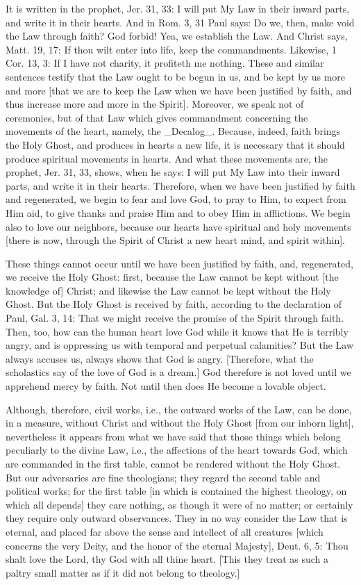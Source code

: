 It is written in the prophet, Jer. 31, 33: I will put My Law in their
inward parts, and write it in their hearts.  And in Rom. 3, 31 Paul
says: Do we, then, make void the Law through faith?  God forbid!  Yea,
we establish the Law.  And Christ says, Matt. 19, 17: If thou wilt
enter into life, keep the commandments.  Likewise, 1 Cor. 13, 3: If I
have not charity, it profiteth me nothing.  These and similar
sentences testify that the Law ought to be begun in us, and be kept
by us more and more [that we are to keep the Law when we have been
justified by faith, and thus increase more and more in the Spirit].
Moreover, we speak not of ceremonies, but of that Law which gives
commandment concerning the movements of the heart, namely, the
_Decalog_.  Because, indeed, faith brings the Holy Ghost, and
produces in hearts a new life, it is necessary that it should produce
spiritual movements in hearts.  And what these movements are, the
prophet, Jer. 31, 33, shows, when he says: I will put My Law into
their inward parts, and write it in their hearts.  Therefore, when we
have been justified by faith and regenerated, we begin to fear and
love God, to pray to Him, to expect from Him aid, to give thanks and
praise Him and to obey Him in afflictions.  We begin also to love our
neighbors, because our hearts have spiritual and holy movements
[there is now, through the Spirit of Christ a new heart mind, and
spirit within].

These things cannot occur until we have been justified by faith, and,
regenerated, we receive the Holy Ghost: first, because the Law cannot
be kept without [the knowledge of] Christ; and likewise the Law
cannot be kept without the Holy Ghost.  But the Holy Ghost is
received by faith, according to the declaration of Paul, Gal. 3, 14:
That we might receive the promise of the Spirit through faith.  Then,
too, how can the human heart love God while it knows that He is
terribly angry, and is oppressing us with temporal and perpetual
calamities?  But the Law always accuses us, always shows that God is
angry.  [Therefore, what the scholastics say of the love of God is a
dream.] God therefore is not loved until we apprehend mercy by faith.
Not until then does He become a lovable object.

Although, therefore, civil works, i.e., the outward works of the Law,
can be done, in a measure, without Christ and without the Holy Ghost
[from our inborn light], nevertheless it appears from what we have
said that those things which belong peculiarly to the divine Law, i.e.,
the affections of the heart towards God, which are commanded in the
first table, cannot be rendered without the Holy Ghost.  But our
adversaries are fine theologians; they regard the second table and
political works; for the first table [in which is contained the
highest theology, on which all depends] they care nothing, as though
it were of no matter; or certainly they require only outward
observances.  They in no way consider the Law that is eternal, and
placed far above the sense and intellect of all creatures [which
concerns the very Deity, and the honor of the eternal Majesty], Deut.
6, 5: Thou shalt love the Lord, thy God with all thine heart.  [This
they treat as such a paltry small matter as if it did not belong to
theology.]

